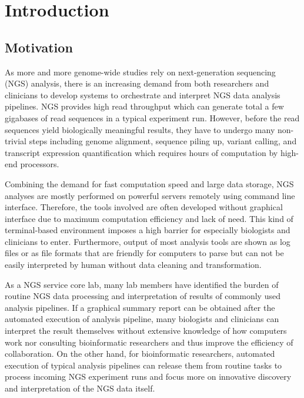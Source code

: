 \chapter{Introduction}
\label{c:intro}

\section{Motivation}
\label{s:motivation}

%
%

As more and more genome-wide studies rely on next-generation sequencing (NGS)
analysis, there is an increasing demand from both researchers and clinicians to
develop systems to orchestrate and interpret NGS data analysis pipelines. NGS
provides high read throughput which can generate total a few gigabases of read
sequences in a typical experiment run. However, before the read sequences yield
biologically meaningful results, they have to undergo many non-trivial steps
including genome alignment, sequence piling up, variant calling, and transcript
expression quantification which requires hours of computation by high-end
processors.

Combining the demand for fast computation speed and large data storage, NGS
analyses are mostly performed on powerful servers remotely using command line
interface. Therefore, the tools involved are often developed without graphical
interface due to maximum computation efficiency and lack of need. This kind of
terminal-based environment imposes a high barrier for especially biologists and
clinicians to enter. Furthermore, output of most analysis tools are shown as
log files or as file formats that are friendly for computers to parse but can
not be easily interpreted by human without data cleaning and transformation.

As a NGS service core lab, many lab members have identified the burden of
routine NGS data processing and interpretation of results of commonly used
analysis pipelines. If a graphical summary report can be obtained after the
automated execution of analysis pipeline, many biologists and clinicians can
interpret the result themselves without extensive knowledge of how computers
work nor consulting bioinformatic researchers and thus improve the efficiency
of collaboration. On the other hand, for bioinformatic researchers, automated
execution of typical analysis pipelines can release them from routine tasks to
process incoming NGS experiment runs and focus more on innovative discovery and
interpretation of the NGS data itself.

